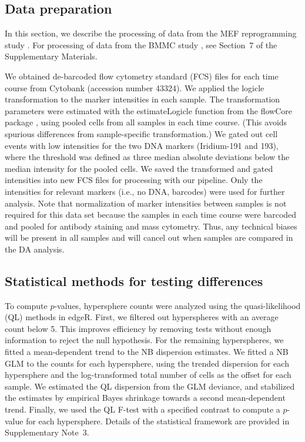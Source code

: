 \documentclass{article}
\newcommand{\suppsecedgeR}{3}
\newcommand{\suppsecbmmc}{7}
\begin{document}
\subsection{Data preparation}
In this section, we describe the processing of data from the MEF reprogramming study \cite{zunder2015continuous}.
For processing of data from the BMMC study \cite{levine2015datadriven}, see Section~\suppsecbmmc{} of the Supplementary Materials.

We obtained de-barcoded flow cytometry standard (FCS) files for each time course from Cytobank (accession number 43324).
We applied the logicle transformation \cite{parks2006new} to the marker intensities in each sample.
The transformation parameters were estimated with the estimateLogicle function from the flowCore package \cite{hahne2009flowcore}, using pooled cells from all samples in each time course.
(This avoids spurious differences from sample-specific transformation.)
We gated out cell events with low intensities for the two DNA markers (Iridium-191 and 193), where the threshold was defined as three median absolute deviations below the median intensity for the pooled cells.
We saved the transformed and gated intensities into new FCS files for processing with our pipeline.
Only the intensities for relevant markers (i.e., no DNA, barcodes) were used for further analysis.
Note that normalization of marker intensities between samples is not required for this data set because the samples in each time course were barcoded and pooled for antibody staining and mass cytometry.
Thus, any technical biases will be present in all samples and will cancel out when samples are compared in the DA analysis.

\subsection{Statistical methods for testing differences}
To compute $p$-values, hypersphere counts were analyzed using the quasi-likelihood (QL) methods in edgeR.
First, we filtered out hyperspheres with an average count below 5.
This improves efficiency by removing tests without enough information to reject the null hypothesis.
For the remaining hyperspheres, we fitted a mean-dependent trend to the NB dispersion estimates.
We fitted a NB GLM to the counts for each hypersphere, using the trended dispersion for each hypersphere and the log-transformed total number of cells as the offset for each sample.
We estimated the QL dispersion from the GLM deviance, and stabilized the estimates by empirical Bayes shrinkage towards a second mean-dependent trend.
Finally, we used the QL F-test with a specified contrast to compute a $p$-value for each hypersphere.
Details of the statistical framework are provided in Supplementary Note~\suppsecedgeR{}.
\end{document}

